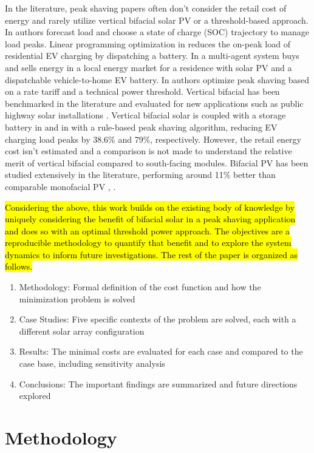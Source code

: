 \documentclass[journal,article,submit,pdftex,moreauthors]{Definitions/mdpi}
\begin{document}
In the literature, peak shaving papers often don't consider the retail cost of energy and rarely utilize vertical bifacial solar PV or a threshold-based approach. In \cite{Reihani2016} authors forecast load and choose a state of charge (SOC) trajectory to manage load peaks. Linear programming optimization in \cite{Lee2014} reduces the on-peak load of residential EV charging by dispatching a battery. In \cite{Gazafroudi2018} a multi-agent system buys and sells energy in a local energy market for a residence with solar PV and a dispatchable vehicle-to-home EV battery. In \cite{Zheng2015} authors optimize peak shaving based on a rate tariff and a technical power threshold. Vertical bifacial has been benchmarked in the literature and evaluated for new applications such as public highway solar installations \cite{Niccolai2022}. Vertical bifacial solar is coupled with a storage battery in \cite{Wallberg2022} and in \cite{Castellucci2022} with a rule-based peak shaving algorithm, reducing EV charging load peaks by 38.6\% and 79\%, respectively. However, the retail energy cost isn't estimated and a comparison is not made to understand the relative merit of vertical bifacial compared to south-facing modules. Bifacial PV has been studied extensively in the literature, performing around 11\% better than comparable monofacial PV \cite{Ogliari2023}, . 

\hl{Considering the above, this work builds on the existing body of knowledge by uniquely considering the benefit of bifacial solar in a peak shaving application and does so with an optimal threshold power approach. The objectives are a reproducible methodology to quantify that benefit and to explore the system dynamics to inform future investigations. The rest of the paper is organized as follows.} 

\begin{enumerate}
	\item Methodology: Formal definition of the cost function and how the minimization problem is solved
	\item Case Studies: Five specific contexts of the problem are solved, each with a different solar array configuration
	\item Results: The minimal costs are evaluated for each case and compared to the case base, including sensitivity analysis
	\item Conclusions: The important findings are summarized and future directions explored
\end{enumerate}

\section{Methodology}\label{methodology}%
\end{document}
